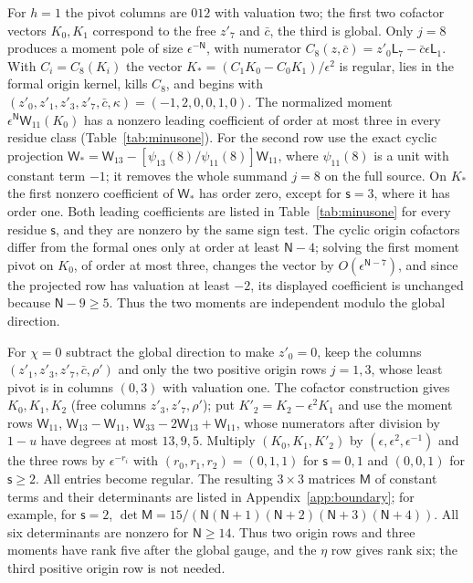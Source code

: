 \documentclass{amsart}
\theoremstyle{definition}
\theoremstyle{remark}
\numberwithin{equation}{section}
\begin{document}
For $h=1$ the pivot columns are $012$ with valuation two; the first two cofactor vectors
$K_0,K_1$ correspond to the free $z'_7$ and $\bar c$, the third is global. Only
$j=8$ produces a moment pole of size $\epsilon^{-\mathsf N}$, with numerator
$C_8(z,\bar c)=z'_0\mathsf L_7-\bar c\epsilon\mathsf L_1$. With $C_i=C_8(K_i)$ the vector
$K_*=(C_1K_0-C_0K_1)/\epsilon^2$ is regular, lies in the formal origin kernel, kills
$C_8$, and begins with $(z'_0,z'_1,z'_3,z'_7,\bar c,\kappa)=(-1,2,0,0,1,0)$. The
normalized moment $\epsilon^{\mathsf N}\mathsf W_{11}(K_0)$ has a nonzero leading
coefficient of order at most three in every residue class (Table~\ref{tab:minusone}). For the second row use the exact cyclic projection
$\mathsf W_*=\mathsf W_{13}-[\psi_{13}(8)/\psi_{11}(8)]\mathsf W_{11}$, where
$\psi_{11}(8)$ is a unit with constant term $-1$; it removes the whole summand $j=8$ on
the full source. On $K_*$ the first nonzero coefficient of $\mathsf W_*$ has order zero,
except for $\mathsf s=3$, where it has order one. Both leading coefficients are listed in
Table~\ref{tab:minusone} for every residue $\mathsf s$, and they are nonzero by the same
sign test. The cyclic origin cofactors differ from the formal
ones only at order at least $\mathsf N-4$; solving the first moment pivot on $K_0$, of
order at most three, changes the vector by $O(\epsilon^{\mathsf N-7})$, and since the
projected row has valuation at least $-2$, its displayed coefficient is unchanged
because $\mathsf N-9\ge5$. Thus the two moments are independent modulo the global
direction.

For $\chi=0$ subtract the global direction to make $z'_0=0$, keep the columns
$(z'_1,z'_3,z'_7,\bar c,\rho')$ and only the two positive origin rows $j=1,3$, whose
least pivot is in columns $(0,3)$ with valuation one. The cofactor construction gives
$K_0,K_1,K_2$ (free columns $z'_3,z'_7,\rho'$); put $K'_2=K_2-\epsilon^2K_1$ and use the
moment rows $\mathsf W_{11}$, $\mathsf W_{13}-\mathsf W_{11}$,
$\mathsf W_{33}-2\mathsf W_{13}+\mathsf W_{11}$, whose numerators after division by
$1-u$ have degrees at most $13,9,5$. Multiply $(K_0,K_1,K'_2)$ by
$(\epsilon,\epsilon^2,\epsilon^{-1})$ and the three rows by $\epsilon^{-r_i}$ with
$(r_0,r_1,r_2)=(0,1,1)$ for $\mathsf s=0,1$ and $(0,0,1)$ for $\mathsf s\ge2$. All entries
become regular. The resulting $3\times3$ matrices $\mathsf M$ of constant terms and their
determinants are listed in Appendix~\ref{app:boundary}; for example, for $\mathsf s=2$,
$\det\mathsf M=15/(\mathsf N(\mathsf N+1)(\mathsf N+2)(\mathsf N+3)(\mathsf N+4))$. All six
determinants are nonzero for $\mathsf N\ge14$. Thus two origin rows and three
moments have rank five after the global gauge, and the $\eta$ row gives rank six; the
third positive origin row is not needed.
\end{document}
